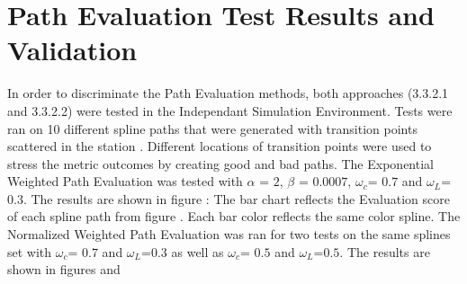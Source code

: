 \section{Path Evaluation Test Results and Validation}
In order to discriminate the Path Evaluation methods,
both approaches (3.3.2.1 and 3.3.2.2) were tested in the Independant Simulation Environment. 
Tests were ran on 10 different spline paths  that were generated with transition points scattered in 
the station .
Different locations of transition points were used to stress the metric outcomes by creating good and bad paths. 
The Exponential Weighted Path Evaluation was tested with \(\alpha\) = \(2\), \(\beta\) = \(0.0007\), 
\(\omega_c\)= \(0.7\) and \(\omega_L\)=\(0.3\).
The results are shown in figure : The bar chart reflects the Evaluation score of each 
spline path from figure . Each bar color reflects the same color spline.
The Normalized Weighted Path Evaluation was ran for two tests on the same splines set with 
\(\omega_c\)= \(0.7\) and \(\omega_L\)=\(0.3\) as well as 
\(\omega_c\)= \(0.5\) and \(\omega_L\)=\(0.5\). 
The results are shown in figures  and 

